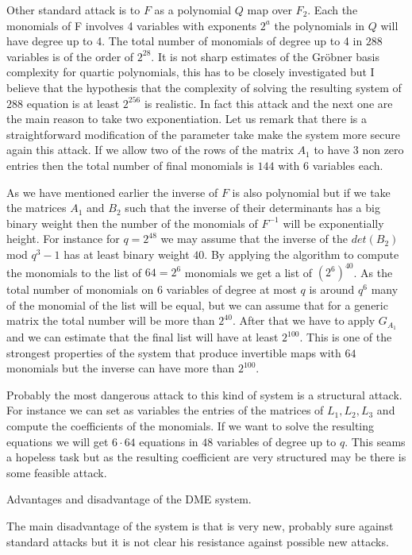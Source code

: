 \documentclass[12pt,a4paper]{amsart}
\theoremstyle{remark}
\theoremstyle{definition}
\begin{document}
Other standard attack is to $F$ as a polynomial $Q$ map over $F_2$. Each the monomials of F involves 4 variables with exponents $2^a$ the  polynomials in $Q$ will have degree up to $4$. The total number of monomials of degree up to 4 in $288$ variables  is of the order of $2^{28}$. 
It is not sharp estimates of the Gr{\"o}bner basis complexity for quartic polynomials, this has to be closely investigated but I believe that 
the hypothesis that the  complexity   of solving the resulting system of $288$ equation is at least $2^{256}$ is realistic. In fact this attack 
and the next one are  the main  reason to take two exponentiation. Let us remark that there is a straightforward modification of the parameter 
take make the system more secure again this attack. If we allow two of the rows of the matrix $A_1$ to have $3$ non zero entries then the total 
number of final monomials is $144$ with $6$ variables each.

As we have mentioned earlier the inverse of $F$ is also polynomial but if we take the matrices $A_1$ and $B_2$ such that the inverse of their 
determinants has a big binary weight then the number of the monomials of $F^{-1}$ will be exponentially height. For instance for $q=2^{48}$ we 
may assume that the inverse of the $det(B_2)$ mod $q^3-1$ has at least binary weight $40$. By  applying the algorithm to compute the monomials
to the list of $64=2^6$ monomials we get a list of $(2^6)^{40}$. As the total number of monomials on $6$ variables of degree at most $q$ 
is around
$q^6$ many of the monomial of the list will be equal, but we can assume that for a generic matrix the total number will be more than $2^{40}$.
After that we have to apply $G_{A_{1}}$ and we can estimate that the final  list will have at least $2^{100}$. This is one of the strongest properties 
of the system that produce invertible maps with $64$ monomials but the inverse can have more than $2^{100}.$

Probably the most dangerous attack to this kind of system is a structural attack. For instance we can set as variables the entries of the matrices of 
$L_1,L_2,L_3$ and compute the coefficients of the monomials. If we want to solve the resulting equations we will get $6\cdot 64$ equations in $48$
variables of degree up to $q$. This seams a hopeless task but as the resulting coefficient are very structured may be there is some 
feasible attack.

Advantages and   disadvantage of the DME system.

The main disadvantage of the system is that is very new, probably sure against standard attacks but it is not clear his resistance against 
possible new attacks.
\end{document}
